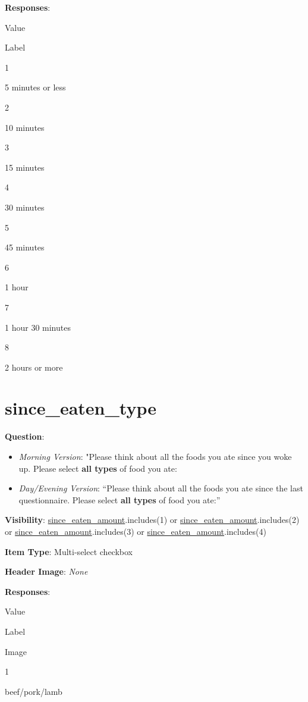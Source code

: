 \documentclass[]{book}
\providecommand{\tightlist}{%
  \setlength{\itemsep}{0pt}\setlength{\parskip}{0pt}}
\begin{document}
\textbf{Responses}:

Value

Label

1

5 minutes or less

2

10 minutes

3

15 minutes

4

30 minutes

5

45 minutes

6

1 hour

7

1 hour 30 minutes

8

2 hours or more

\hypertarget{since_eaten_type}{%
\section{since\_eaten\_type}\label{since_eaten_type}}

\textbf{Question}:

\begin{itemize}
\tightlist
\item
  \emph{Morning Version}: "Please think about all the foods you ate since you woke up. Please select \textbf{all types} of food you ate:
\item
  \emph{Day/Evening Version}: ``Please think about all the foods you ate since the last questionnaire. Please select \textbf{all types} of food you ate:''
\end{itemize}

\textbf{Visibility}: \protect\hyperlink{since_eaten_amount}{since\_eaten\_amount}.includes(1) or \protect\hyperlink{since_eaten_amount}{since\_eaten\_amount}.includes(2) or \protect\hyperlink{since_eaten_amount}{since\_eaten\_amount}.includes(3) or \protect\hyperlink{since_eaten_amount}{since\_eaten\_amount}.includes(4)

\textbf{Item Type}: Multi-select checkbox

\textbf{Header Image}: \emph{None}

\textbf{Responses}:

Value

Label

Image

1

beef/pork/lamb
\end{document}
